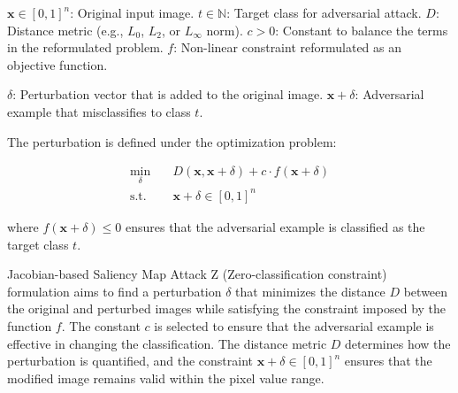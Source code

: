 
$\mathbf{x} \in [0, 1]^n$: Original input image.
 $t \in \mathbb{N}$: Target class for adversarial attack.
 $D$: Distance metric (e.g., $L_0$, $L_2$, or $L_\infty$ norm).
$c > 0$: Constant to balance the terms in the reformulated problem.
$f$: Non-linear constraint reformulated as an objective function.

$\delta$: Perturbation vector that is added to the original image.
$\mathbf{x} + \delta$: Adversarial example that misclassifies to class $t$.

The perturbation is defined under the optimization problem:

\[
\begin{aligned}
\min_{\delta} & \quad D(\mathbf{x}, \mathbf{x} + \delta) + c \cdot f(\mathbf{x} + \delta) \\
\text{s.t.} & \quad \mathbf{x} + \delta \in [0, 1]^n
\end{aligned}
\]

where \( f(\mathbf{x} + \delta) \leq 0 \) ensures that the adversarial example is classified as the target class \( t \).

Jacobian-based Saliency Map Attack Z (Zero-classification constraint) formulation aims to find a perturbation \( \delta \) that minimizes the distance \( D \) between the original and perturbed images while satisfying the constraint imposed by the function \( f \). The constant \( c \) is selected to ensure that the adversarial example is effective in changing the classification. The distance metric \( D \) determines how the perturbation is quantified, and the constraint \( \mathbf{x} + \delta \in [0, 1]^n \) ensures that the modified image remains valid within the pixel value range.